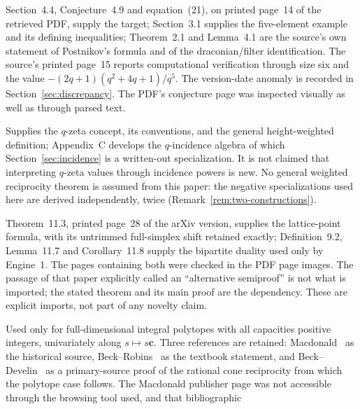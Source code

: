 \documentclass[11pt]{article}
\numberwithin{equation}{section}
\theoremstyle{definition}
\theoremstyle{remark}
\begin{document}
\begin{description}[style=nextline,leftmargin=1.2em,labelwidth=0pt,labelindent=0pt,font=\normalfont\bfseries]
\item[Athanasiadis--Chapoton, arXiv:2605.26916v1.]
Section~4.4, Conjecture~4.9 and equation~(21), on printed page~14 of the
retrieved PDF, supply the target; Section~3.1 supplies the five-element
example and its defining inequalities; Theorem~2.1 and Lemma~4.1 are the
source's own statement of Postnikov's formula and of the draconian/filter
identification. The source's printed page~15 reports computational
verification through size six and the value $-(2q+1)(q^2+4q+1)/q^5$. The
version-date anomaly is recorded in Section~\ref{sec:discrepancy}. The PDF's
conjecture page was inspected visually as well as through parsed text.
\item[Chapoton, arXiv:2402.11979v2, revised 29 January 2025.]
Supplies the $q$-zeta concept, its conventions, and the general
height-weighted definition; Appendix~C develops the $q$-incidence algebra of
which Section~\ref{sec:incidence} is a written-out specialization. It is not
claimed that interpreting $q$-zeta values through incidence powers is new. No
general weighted reciprocity theorem is assumed from this paper: the negative
specializations used here are derived independently, twice
(Remark~\ref{rem:two-constructions}).
\item[Postnikov, arXiv:math/0507163v1; IMRN 2009(6), 1026--1106.]
Theorem~11.3, printed page~28 of the arXiv version, supplies the lattice-point
formula, with its untrimmed full-simplex shift retained exactly;
Definition~9.2, Lemma~11.7 and Corollary~11.8 supply the bipartite duality
used only by Engine~1. The pages containing both were checked in the PDF page
images. The passage of that paper explicitly called an ``alternative
semiproof'' is not what is imported; the stated theorem and its main proof
are the dependency. These are explicit imports, not part of any novelty claim.
\item[Ehrhart--Macdonald reciprocity.]
Used only for full-dimensional integral polytopes with all capacities positive
integers, univariately along $s\mapsto s\mathbf c$. Three references are
retained: Macdonald~\cite{Macdonald} as the historical source,
Beck--Robins~\cite[Chapter~4]{BeckRobins} as the textbook statement, and
Beck--Develin~\cite{BeckDevelin} as a primary-source proof of the rational
cone reciprocity from which the polytope case follows. The Macdonald publisher
page was not accessible through the browsing tool used, and that bibliographic

\end{description}
\end{document}
